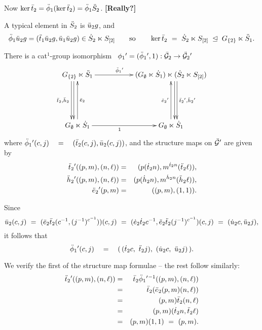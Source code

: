 \bigskip\noindent
Now $\ker\bar{t}_2 = \ddot{\phi}_1(\ker\ddot{t}_2) = \ddot{\phi}_1\ddot{S}_2$.
\hfill {\bf [Really?]} 

\medskip\noindent
A typical element in $\ddot{S}_2$ is $\ddot{u}_2 g$, and
\begin{equation}
\ddot{\phi}_1\ddot{u}_2 g = (\ddot{t}_1\ddot{u}_2 g, \ddot{u}_1\ddot{u}_2 g) \in \dot{S}_2 \ltimes S_{[2]}
\qquad\mbox{so}\qquad
\ker\bar{t}_2 ~=~ \dot{S}_2 \ltimes S_{[2]} ~\unlhd~ G_{\{2\}} \ltimes \ddot{S}_1.
\end{equation}

\begin{lem} \label{lem:cat1iso-prime}
There is a cat$^1$-group isomorphism~ 
$\phi_1{}^{\prime} = (\ddot{\phi}_1{}^{\prime},1) : \bar{\mathcal{G}}_2 \to \ddot{\mathcal{G}}_2{}^{\prime}$
$$
\xymatrix @C=2pc @R=2pc{
  \GGbt \ltimes \ddSSo 
   \ar[dd] <-1.2ex>  \ar[dd] <-2.0ex>_{\barttt,\barhht}
   \ar[rr]^(0.45){\ddphod}
  &&  (\GGe \ltimes \dSSo) \ltimes (\dSSt \ltimes \SSot) 
       \ar[dd] <+1.2ex>  \ar[dd] <+2.0ex>^{\ddtttd,\ddhhtd}  \\
  &&   \\
 \GGe \ltimes \dSSo  \ar[uu]_{\bareet}
   \ar[rr]_(0.45){1}
  &&  \GGe \ltimes \dSSo  \ar[uu]^{\ddeetd}
 \\
}
$$
where $\ddot{\phi}_1{}^{\prime}(c,j) \quad=\quad (\bar{t}_2(c,j),\bar{u}_2(c,j))$, 
and the structure maps on $\ddot{\mathcal{G}}{}^{\prime}$ are given by
\begin{eqnarray*}
\ddot{t}_2{}^{\prime}((p,m),(n,\ell)) &=& (p(\dot{t}_2 n),m^{\dot{t}_2 n}(\ddot{t}_2\ell)),\\
\ddot{h}_2{}^{\prime}((p,m),(n,\ell)) &=& (p(\dot{h}_2 n),m^{\dot{h}_2 n}(\ddot{h}_2\ell)),\\
\ddot{e}_2{}^{\prime}(p,m) &=& ((p,m),(1,1)).
\end{eqnarray*}
\end{lem}
\begin{pf}
Since
$$
\bar{u}_2(c,j)
~=~ (\bar{e}_2\bar{t}_2(c^{-1},(j^{-1})^{c^{-1}}))(c,j)
~=~ (\dot{e}_2\dot{t}_2 c^{-1}, \ddot{e}_2\ddot{t}_2(j^{-1})^{c^{-1}})(c,j)
~=~ (\dot{u}_2 c, \ddot{u}_2 j),
$$
it follows that 
$$
\ddot{\phi}_1{}^{\prime}(c,j) \quad=\quad
(\,(\dot{t}_2 c,~\ddot{t}_2 j),~ (\dot{u}_2 c,~\ddot{u}_2 j)\,).
$$

\noindent
We verify the first of the structure map formulae -- the rest 
follow similarly:
\begin{eqnarray*}
\ddot{t}_2{}^{\prime}((p,m),(n,\ell)) 
  &=&  \bar{t}_2 \ddot{\phi}_1{}^{\prime}{}^{-1}((p,m),(n,\ell)) \\
  &=&  \bar{t}_2(\bar{e}_2(p,m)(n,\ell)) \\
  &=&  (p,m)\bar{t}_2(n,\ell) \\
  &=&  (p,m)(\dot{t}_2 n, \ddot{t}_2 \ell) \\
  &=&  (p,m)(1,1) ~=~ (p,m).
\end{eqnarray*}
\end{pf}

